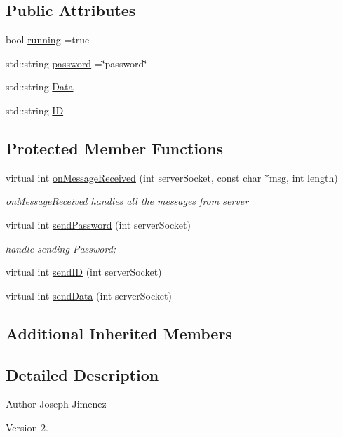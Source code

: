 \subsection*{Public Attributes}
\begin{DoxyCompactItemize}
\item 
bool \hyperlink{class_client_app_a27d8d49b10a6a5849d747a99bd4c5646}{running} =true
\item 
std\+::string \hyperlink{class_client_app_a6fe703fe3bfd4f061d276751b5b0194a}{password} =\char`\"{}password\char`\"{}
\item 
std\+::string \hyperlink{class_client_app_a130ab0916e0079bfb00ea09f8a2665f8}{Data}
\item 
std\+::string \hyperlink{class_client_app_a530ab72352f51275d34354decf8075d4}{ID}
\end{DoxyCompactItemize}
\subsection*{Protected Member Functions}
\begin{DoxyCompactItemize}
\item 
virtual int \hyperlink{class_client_app_a16760d90c12ceee5ad146aa909d2fe76}{on\+Message\+Received} (int server\+Socket, const char $\ast$msg, int length)
\begin{DoxyCompactList}\small\item\em on\+Message\+Received handles all the messages from server \end{DoxyCompactList}\item 
virtual int \hyperlink{class_client_app_a641103eef19d7e08c87d22478c6904f0}{send\+Password} (int server\+Socket)
\begin{DoxyCompactList}\small\item\em handle sending Password; \end{DoxyCompactList}\item 
virtual int \hyperlink{class_client_app_a4a769a030e9f6a1dd3dbab2faa679d82}{send\+ID} (int server\+Socket)
\item 
virtual int \hyperlink{class_client_app_aa87e05e7261baddf26b0755becf247ae}{send\+Data} (int server\+Socket)
\end{DoxyCompactItemize}
\subsection*{Additional Inherited Members}


\subsection{Detailed Description}
\begin{DoxyAuthor}{Author}
Joseph Jimenez 
\end{DoxyAuthor}
\begin{DoxyVersion}{Version}
2. 
\end{DoxyVersion}


